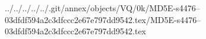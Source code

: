 ../../../../../.git/annex/objects/VQ/0k/MD5E-s4476--03dfdf594a2c3dfccc2e67e797dd9542.tex/MD5E-s4476--03dfdf594a2c3dfccc2e67e797dd9542.tex